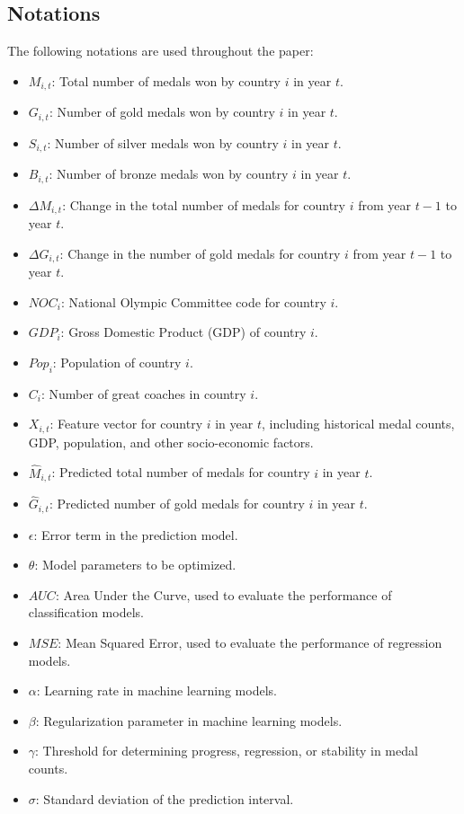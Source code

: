 \documentclass{mcmthesis}
\begin{document}
  \subsection{Notations}
  The following notations are used throughout the paper:

  \begin{itemize}
      \item \( M_{i,t} \): Total number of medals won by country \( i \) in year \( t \).
      \item \( G_{i,t} \): Number of gold medals won by country \( i \) in year \( t \).
      \item \( S_{i,t} \): Number of silver medals won by country \( i \) in year \( t \).
      \item \( B_{i,t} \): Number of bronze medals won by country \( i \) in year \( t \).
      \item \( \Delta M_{i,t} \): Change in the total number of medals for country \( i \) from year \( t-1 \) to year \( t \).
      \item \( \Delta G_{i,t} \): Change in the number of gold medals for country \( i \) from year \( t-1 \) to year \( t \).
      \item \( NOC_i \): National Olympic Committee code for country \( i \).
      \item \( GDP_i \): Gross Domestic Product (GDP) of country \( i \).
      \item \( Pop_i \): Population of country \( i \).
      \item \( C_i \): Number of great coaches in country \( i \).
      \item \( X_{i,t} \): Feature vector for country \( i \) in year \( t \), including historical medal counts, GDP, population, and other socio-economic factors.
      \item \( \hat{M}_{i,t} \): Predicted total number of medals for country \( i \) in year \( t \).
      \item \( \hat{G}_{i,t} \): Predicted number of gold medals for country \( i \) in year \( t \).
      \item \( \epsilon \): Error term in the prediction model.
      \item \( \theta \): Model parameters to be optimized.
      \item \( AUC \): Area Under the Curve, used to evaluate the performance of classification models.
      \item \( MSE \): Mean Squared Error, used to evaluate the performance of regression models.
      \item \( \alpha \): Learning rate in machine learning models.
      \item \( \beta \): Regularization parameter in machine learning models.
      \item \( \gamma \): Threshold for determining progress, regression, or stability in medal counts.
      \item \( \sigma \): Standard deviation of the prediction interval.
  \end{itemize}
  
\end{document}
